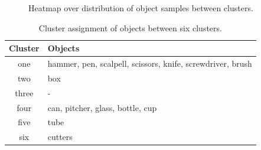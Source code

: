 \begin{figure}
	
	\caption{Heatmap over distribution of object samples between clusters.}
	\label{fig:obj_sample_heatmap}
\end{figure}

\begin{table}
	\begin{tabular}{|c|l|}
		\hline
		Cluster & Objects \\
		\hline
		one   & hammer, pen, scalpell, scissors, knife, screwdriver, brush \\
		two   & box \\
		three & - \\
		four  & can, pitcher, glass, bottle, cup \\
		five  & tube \\
		six   & cutters \\
		\hline
	\end{tabular}
	\caption{Cluster assignment of objects between six clusters.}
	\label{tab:object_cluster_assign}
\end{table}

